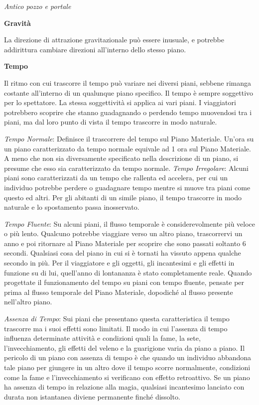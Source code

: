 \documentclass[a4paper,twoside,openany]{book}
\begin{document}
\begin{multicols}{2}
\begin{center}
	\medskip

	\emph{Antico pozzo e portale}
\end{center}


\textbf{Gravità}

\medskip

La direzione di attrazione gravitazionale può essere inusuale, e potrebbe addirittura cambiare direzioni all'interno dello stesso piano.

\medskip

\textbf{Tempo}

\medskip

Il ritmo con cui trascorre il tempo può variare nei diversi piani, sebbene rimanga costante all'interno di un qualunque piano specifico. Il tempo è sempre soggettivo per lo spettatore. La stessa soggettività si applica ai vari piani. I viaggiatori potrebbero scoprire che stanno guadagnando o perdendo tempo muovendosi tra i piani, ma dal loro punto di vista il tempo trascorre in modo naturale.


\emph{Tempo Normale}: Definisce il trascorrere del tempo sul Piano Materiale. Un'ora su un piano caratterizzato da tempo normale equivale ad 1 ora sul Piano Materiale. A meno che non sia diversamente specificato nella descrizione di un piano, si presume che esso sia caratterizzato da tempo normale.
\emph{Tempo Irregolare}: Alcuni piani sono caratterizzati da un tempo che rallenta ed accelera, per cui un individuo potrebbe perdere o guadagnare tempo mentre si muove tra piani come questo ed altri. Per gli abitanti di un simile piano, il tempo trascorre in modo naturale e lo spostamento passa inosservato.


\emph{Tempo Fluente}: Su alcuni piani, il flusso temporale è considerevolmente più veloce o più lento. Qualcuno potrebbe viaggiare verso un altro piano, trascorrervi un anno e poi ritornare al Piano Materiale per scoprire che sono passati soltanto 6 secondi. Qualsiasi cosa del piano in cui si è tornati ha vissuto appena qualche secondo in più. Per il viaggiatore e gli oggetti, gli incantesimi e gli effetti in funzione su di lui, quell'anno di lontananza è stato completamente reale. Quando progettate il funzionamento del tempo su piani con tempo fluente, pensate per prima al flusso temporale del Piano Materiale, dopodiché al flusso presente nell'altro piano.


\emph{Assenza di Tempo}: Sui piani che presentano questa caratteristica il tempo trascorre ma i suoi effetti sono limitati. Il modo in cui l'assenza di tempo influenza determinate attività e condizioni quali la fame, la sete, l'invecchiamento, gli effetti del veleno e la guarigione varia da piano a piano. Il pericolo di un piano con assenza di tempo è che quando un individuo abbandona tale piano per giungere in un altro dove il tempo scorre normalmente, condizioni come la fame e l'invecchiamento si verificano con effetto retroattivo. Se un piano ha assenza di tempo in relazione alla magia, qualsiasi incantesimo lanciato con durata non istantanea diviene permanente finché dissolto.


\end{multicols}
\end{document}
